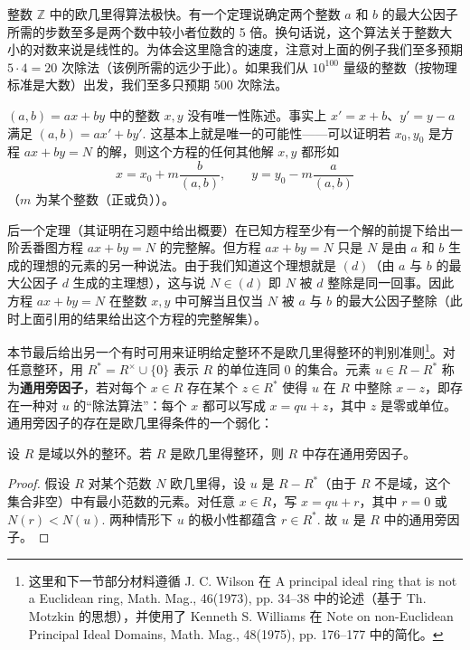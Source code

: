 整数 \(\mathbb{Z}\) 中的欧几里得算法极快。有一个定理说确定两个整数 \(a\) 和 \(b\) 的最大公因子所需的步数至多是两个数中较小者位数的 5 倍。换句话说，这个算法关于整数大小的对数来说是线性的。为体会这里隐含的速度，注意对上面的例子我们至多预期 \(5\cdot 4 = 20\) 次除法（该例所需的远少于此）。如果我们从 \(10^{100}\) 量级的整数（按物理标准是大数）出发，我们至多只预期 500 次除法。

\((a, b) = ax + by\) 中的整数 \(x, y\) 没有唯一性陈述。事实上 \(x' = x + b\)、\(y' = y - a\) 满足 \((a, b) = ax' + by'\). 这基本上就是唯一的可能性——可以证明若 \(x_0, y_0\) 是方程 \(ax + by = N\) 的解，则这个方程的任何其他解 \(x, y\) 都形如
\[
x = x_0 + m\frac{b}{(a, b)}, \qquad y = y_0 - m\frac{a}{(a, b)}
\]
（\(m\) 为某个整数（正或负））。

后一个定理（其证明在习题中给出概要）在已知方程至少有一个解的前提下给出一阶丢番图方程 \(ax + by = N\) 的完整解。但方程 \(ax + by = N\) 只是 \(N\) 是由 \(a\) 和 \(b\) 生成的理想的元素的另一种说法。由于我们知道这个理想就是 \((d)\)（由 \(a\) 与 \(b\) 的最大公因子 \(d\) 生成的主理想），这与说 \(N \in (d)\) 即 \(N\) 被 \(d\) 整除是同一回事。因此方程 \(ax + by = N\) 在整数 \(x, y\) 中可解当且仅当 \(N\) 被 \(a\) 与 \(b\) 的最大公因子整除（此时上面引用的结果给出这个方程的完整解集）。

本节最后给出另一个有时可用来证明给定整环不是欧几里得整环的判别准则\footnote{这里和下一节部分材料遵循 J. C. Wilson 在 A principal ideal ring that is not a Euclidean ring, Math. Mag., 46(1973), pp. 34--38 中的论述（基于 Th. Motzkin 的思想），并使用了 Kenneth S. Williams 在 Note on non-Euclidean Principal Ideal Domains, Math. Mag., 48(1975), pp. 176--177 中的简化。}。对任意整环，用 \(R^* = R^\times \cup \{0\}\) 表示 \(R\) 的单位连同 0 的集合。元素 \(u \in R - R^*\) 称为\textbf{通用旁因子}，若对每个 \(x \in R\) 存在某个 \(z \in R^*\) 使得 \(u\) 在 \(R\) 中整除 \(x - z\)，即存在一种对 \(u\) 的“除法算法”：每个 \(x\) 都可以写成 \(x = qu + z\)，其中 \(z\) 是零或单位。通用旁因子的存在是欧几里得条件的一个弱化：

\begin{proposition}\label{pro:8.5}
设 \(R\) 是域以外的整环。若 \(R\) 是欧几里得整环，则 \(R\) 中存在通用旁因子。
\end{proposition}

\begin{proof}
假设 \(R\) 对某个范数 \(N\) 欧几里得，设 \(u\) 是 \(R - R^*\)（由于 \(R\) 不是域，这个集合非空）中有最小范数的元素。对任意 \(x \in R\)，写 \(x = qu + r\)，其中 \(r = 0\) 或 \(N(r) < N(u)\). 两种情形下 \(u\) 的极小性都蕴含 \(r \in R^*\). 故 \(u\) 是 \(R\) 中的通用旁因子。
\end{proof}


